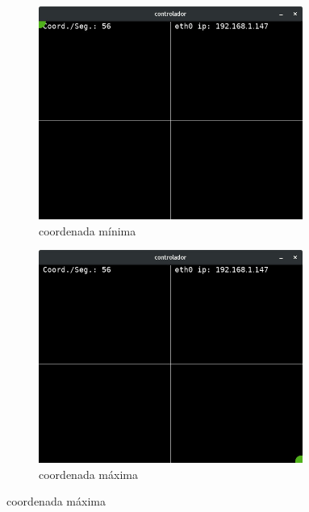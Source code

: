 \begin{figure}[H]
	\centering
	\begin{subfigure}{.5\textwidth}
		\includegraphics[width=0.95\textwidth]{figuras/controlador0x0.jpg}
		\caption{coordenada mínima}
		\label{fig:sistcoord0x0}
	\end{subfigure}%
	\begin{subfigure}{.5\textwidth}
		\includegraphics[width=0.95\textwidth]{figuras/controlador100x100.jpg}
		\caption{coordenada máxima}
		\label{fig:sistcoord100x100}
	\end{subfigure}


\end{figure}
